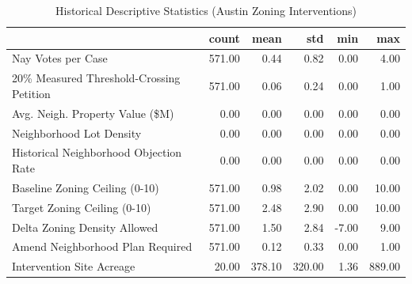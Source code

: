 \begin{table}[h]
\centering
\caption{Historical Descriptive Statistics (Austin Zoning Interventions)}
\label{tab:summary_stats}
\begin{tabular}{lrrrrr}
\toprule
 & count & mean & std & min & max \\
\midrule
Nay Votes per Case & 571.00 & 0.44 & 0.82 & 0.00 & 4.00 \\
20\% Measured Threshold-Crossing Petition & 571.00 & 0.06 & 0.24 & 0.00 & 1.00 \\
Avg. Neigh. Property Value (\$M) & 0.00 & 0.00 & 0.00 & 0.00 & 0.00 \\
Neighborhood Lot Density & 0.00 & 0.00 & 0.00 & 0.00 & 0.00 \\
Historical Neighborhood Objection Rate & 0.00 & 0.00 & 0.00 & 0.00 & 0.00 \\
Baseline Zoning Ceiling (0-10) & 571.00 & 0.98 & 2.02 & 0.00 & 10.00 \\
Target Zoning Ceiling (0-10) & 571.00 & 2.48 & 2.90 & 0.00 & 10.00 \\
Delta Zoning Density Allowed & 571.00 & 1.50 & 2.84 & -7.00 & 9.00 \\
Amend Neighborhood Plan Required & 571.00 & 0.12 & 0.33 & 0.00 & 1.00 \\
Intervention Site Acreage & 20.00 & 378.10 & 320.00 & 1.36 & 889.00 \\
\bottomrule
\end{tabular}
\end{table}

